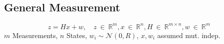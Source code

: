 \subsection{General Measurement}
\begin{equation*}
    z = Hx + w, \quad z \ \in \ \mathbb{R}^m, x \ \in \ \mathbb{R}^n, H \ \in \ \mathbb{R}^{m\times n}, w \ \in \ \mathbb{R}^m
\end{equation*}
$m$ Measurements, $n$ States, $w_i \sim \mathcal{N}(0,R)$, $x,w_i$ assumed mut. indep.
